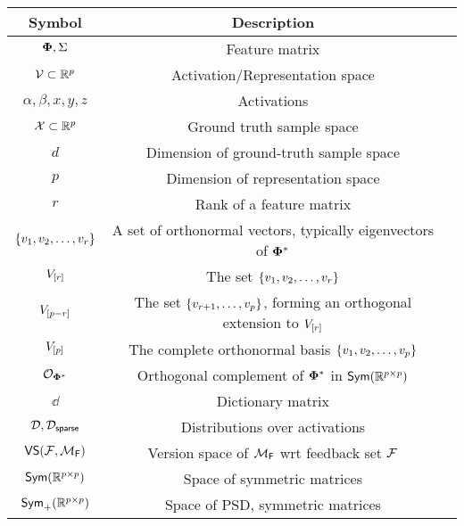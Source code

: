 \begin{table}[h]
\centering
\begin{tabular}{|c|c|c|}
\hline
\textbf{Symbol} & \textbf{Description}\\
\hline
$\boldsymbol{\Phi}, \Sigma$ & Feature matrix\\
${\mathcal{V}} \subset \mathbb{R}^p$ & Activation/Representation space\\
$\alpha, \beta, x,y,z$ & Activations\\
${\mathcal{X}} \subset \mathbb{R}^p$ & Ground truth sample space\\
$d$ & Dimension of ground-truth sample space\\
$p$ & Dimension of representation space\\
$r$ & Rank of a feature matrix\\
$\left\{v_1, v_2, \ldots, v_r\right\}$ & A set of orthonormal vectors, typically eigenvectors of $\boldsymbol{\Phi}^*$\\
$V_{\left[r\right]}$ & The set $\left\{v_1, v_2, \ldots, v_r\right\}$ \\
$V_{\left[p - r\right]}$ & The set $\left\{v_{r+1}, \ldots, v_p\right\}$, forming an orthogonal extension to $V_{\left[r\right]}$ \\
$V_{\left[p\right]}$ & The complete orthonormal basis $\left\{v_1, v_2, \ldots, v_p\right\}$ \\
$\mathcal{O}_{\boldsymbol{\Phi}^*}$ & Orthogonal complement of $\boldsymbol{\Phi}^*$ in $\textsf{Sym}(\mathbb{R}^{p\times p})$\\
$\dd$ & Dictionary matrix\\
${\mathcal{D}}, {\mathcal{D}}_{\textsf{sparse}}$ & Distributions over activations\\
$\textsf{VS}({\mathcal{F}}, {\mathcal{M}}_{\textsf{F}})$ & Version space of ${\mathcal{M}}_{\textsf{F}}$ wrt feedback set ${\mathcal{F}}$\\ 
$\textsf{Sym}(\mathbb{R}^{p\times p})$ & Space of symmetric matrices\\
$\textsf{Sym}_{+}(\mathbb{R}^{p\times p})$ & Space of PSD, symmetric matrices\\
\hline
\end{tabular}
\end{table}
\fi

